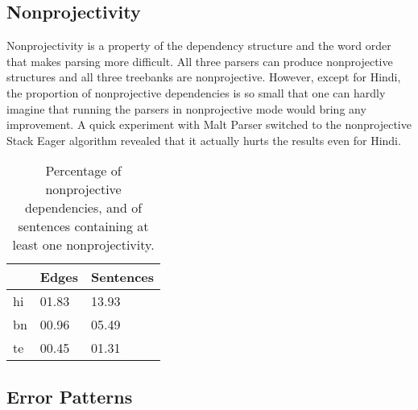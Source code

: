 \documentclass[11pt]{article}
\newcommand{\hi}[1]{{\hifont #1}}
\newcommand{\bn}[1]{{\bnfont #1}}
\newcommand{\te}[1]{{\tefont #1}}
\newcommand{\translit}[1]{{\translitfont \textit{(#1)}}}
\begin{document}

\subsection{Nonprojectivity}
\label{sec:nonprojectivity}

Nonprojectivity is a property of the dependency structure and the word order \citep{neproj} that makes parsing more difficult. All three parsers can produce nonprojective structures and all three treebanks are nonprojective. However, except for Hindi, the proportion of nonprojective dependencies is so small that one can hardly imagine that running the parsers in nonprojective mode would bring any improvement. A quick experiment with Malt Parser switched to the nonprojective Stack Eager algorithm revealed that it actually hurts the results even for Hindi.

\begin{table}[ht]
\begin{centering}
\begin{tabular}{l|ll}
& \textbf{Edges} & \textbf{Sentences} \\
\hline
hi & 01.83 & 13.93\\
bn & 00.96 & 05.49\\
te & 00.45 & 01.31\\
\end{tabular}
\caption{Percentage of nonprojective dependencies, and of sentences containing at least one nonprojectivity.}
\label{tab:nonprojectivity}
\end{centering}
\end{table}

\subsection{Error Patterns}
\label{sec:errors}
\end{document}
